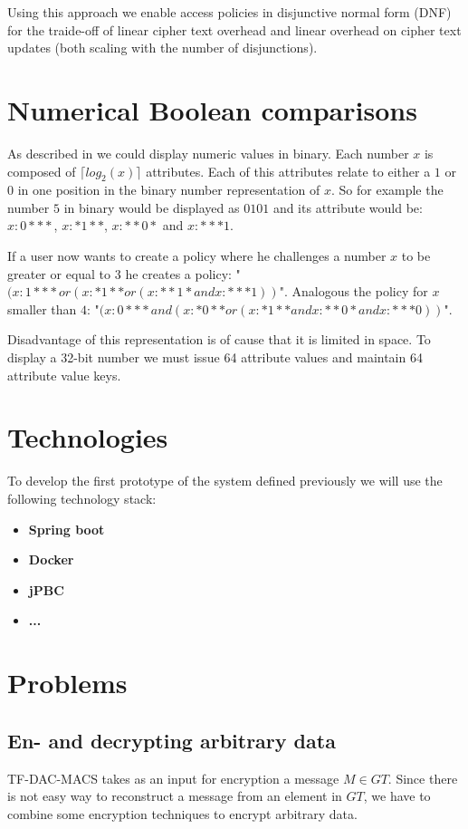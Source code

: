 Using this approach we enable access policies in disjunctive normal form (DNF) for the traide-off of linear cipher text overhead and linear overhead on cipher text updates (both scaling with the number of disjunctions).

\section{Numerical Boolean comparisons}
As described in \cite{bethencourt2007ciphertext} we could display numeric values in binary. Each number $x$ is composed of $\lceil log_2(x) \rceil$ attributes. Each of this attributes relate to either a $1$ or $0$ in one position in the binary number representation of $x$. So for example the number $5$ in binary would be displayed as $0101$ and its attribute would be: $x:0***$, $x:*1**$, $x:**0*$ and $x:***1$. 

If a user now wants to create a policy where he challenges a number $x$ to be greater or equal to $3$ he creates a policy: "$(x:1*** or (x:*1** or (x:**1* and x:***1))$". Analogous the policy for $x$ smaller than $4$: "$(x:0*** and (x:*0** or (x:*1** and x:**0* and x:***0))$".

Disadvantage of this representation is of cause that it is limited in space. To display a 32-bit number we must issue 64 attribute values and maintain 64 attribute value keys. 


\section{Technologies}
To develop the first prototype of the system defined previously we will use the following technology stack:

\begin{itemize}
  \item \textbf{Spring boot}
  \item \textbf{Docker}
  \item \textbf{jPBC} \cite{ISCC:DecIov11}
  \item \textbf{...}
\end{itemize}

\section{Problems}

\subsection{En- and decrypting arbitrary data}
TF-DAC-MACS takes as an input for encryption a message $M \in GT$. Since there is not easy way to reconstruct a message from an element in $GT$, we have to combine some encryption techniques to encrypt arbitrary data. 

